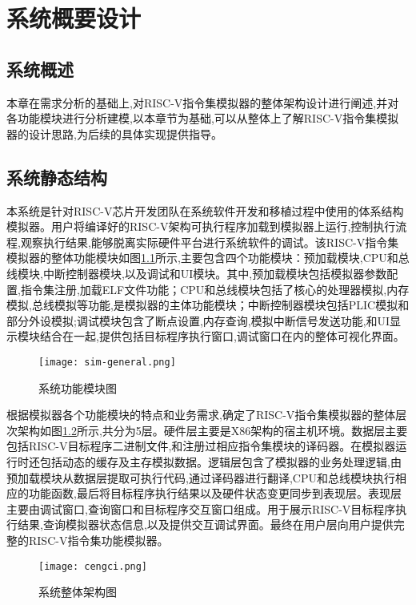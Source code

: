 
\chapter{系统概要设计}

\section{系统概述}
本章在需求分析的基础上,对RISC-V指令集模拟器的整体架构设计进行阐述,并对各功能模块进行分析建模,以本章节为基础,可以从整体上了解RISC-V指令集模拟器的设计思路,为后续的具体实现提供指导。


\section{系统静态结构}
本系统是针对RISC-V芯片开发团队在系统软件开发和移植过程中使用的体系结构模拟器。用户将编译好的RISC-V架构可执行程序加载到模拟器上运行,控制执行流程,观察执行结果,能够脱离实际硬件平台进行系统软件的调试。该RISC-V指令集模拟器的整体功能模块如图\ref{fig:sim_general}所示,主要包含四个功能模块：预加载模块,CPU和总线模块,中断控制器模块,以及调试和UI模块。其中,预加载模块包括模拟器参数配置,指令集注册,加载ELF文件功能；CPU和总线模块包括了核心的处理器模拟,内存模拟,总线模拟等功能,是模拟器的主体功能模块；中断控制器模块包括PLIC模拟和部分外设模拟;调试模块包含了断点设置,内存查询,模拟中断信号发送功能,和UI显示模块结合在一起,提供包括目标程序执行窗口,调试窗口在内的整体可视化界面。
\begin{figure}[H]
  \centering
  \texttt{[image: sim-general.png]}
  \caption{系统功能模块图}
  \label{fig:sim_general}
\end{figure}


根据模拟器各个功能模块的特点和业务需求,确定了RISC-V指令集模拟器的整体层次架构如图\ref{fig:structure}所示,共分为5层。硬件层主要是X86架构的宿主机环境。数据层主要包括RISC-V目标程序二进制文件,和注册过相应指令集模块的译码器。在模拟器运行时还包括动态的缓存及主存模拟数据。逻辑层包含了模拟器的业务处理逻辑,由预加载模块从数据层提取可执行代码,通过译码器进行翻译,CPU和总线模块执行相应的功能函数,最后将目标程序执行结果以及硬件状态变更同步到表现层。表现层主要由调试窗口,查询窗口和目标程序交互窗口组成。用于展示RISC-V目标程序执行结果,查询模拟器状态信息,以及提供交互调试界面。最终在用户层向用户提供完整的RISC-V指令集功能模拟器。


\begin{figure}[H]
  \centering
  \texttt{[image: cengci.png]}
  \caption{系统整体架构图}
  \label{fig:structure}
\end{figure}

